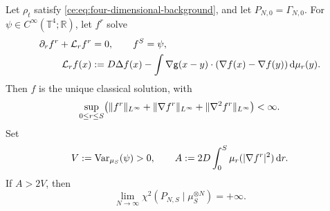 \documentclass[11pt,reqno]{amsart}
\numberwithin{equation}{section}
\theoremstyle{plain}
\theoremstyle{remark}
\DeclarePairedDelimiter{\norm}{\lVert}{\rVert}
\newcommand{\T}{\mathbb T}\newcommand{\R}{\mathbb R}\newcommand{\Z}{\mathbb Z}
\begin{document}
\begin{prop}\label{ce:prop:noiseobstruction}
Let $\rho_t$ satisfy \eqref{ce:eq:four-dimensional-background}, and let $P_{N,0}=\Gamma_{N,0}$. For $\psi\in C^\infty(\T^4;\R)$, let $f^r$ solve
\begin{align}
 \partial_r f^r+\mathcal L_r f^r&=0,\qquad f^S=\psi,\label{ce:eq:full-adjoint}\\
 \mathcal L_r f(x)&:=D\Delta f(x)-\int\nabla\mathsf g(x-y)\cdot(\nabla f(x)-\nabla f(y))\,\mathrm d\mu_r(y).\label{ce:eq:full-adjoint-generator}
\end{align}
Then $f$ is the unique classical solution, with
\begin{equation}\label{ce:eq:full-adjoint-bound}
 \sup_{0\le r\le S}\bigl(\norm{f^r}_{L^\infty}+\norm{\nabla f^r}_{L^\infty}+\norm{\nabla^2 f^r}_{L^\infty}\bigr)<\infty.
\end{equation}
Set
\begin{equation}\label{ce:eq:noisecriterion}
 V:=\operatorname{Var}_{\mu_S}(\psi)>0,\qquad
 A:=2D\int_0^S\mu_r(|\nabla f^r|^2)\,\mathrm d r.
\end{equation}
If $A>2V$, then
\begin{equation}\label{ce:eq:chiobstruction}
 \lim_{N\to\infty}\chi^2(P_{N,S}\mid\mu_S^{\otimes N})=+\infty.
\end{equation}
\end{prop}
\end{document}
